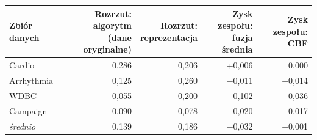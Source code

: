 \begin{tabular}{lrrrr}
\toprule
Zbiór danych & \makecell[r]{Rozrzut: algorytm\\(dane oryginalne)} & \makecell[r]{Rozrzut:\\reprezentacja} & \makecell[r]{Zysk zespołu:\\fuzja średnia} & \makecell[r]{Zysk zespołu:\\CBF} \\
\midrule
Cardio & 0,286 & 0,206 & +0,006 & 0,000 \\
Arrhythmia & 0,125 & 0,260 & $-$0,011 & +0,014 \\
WDBC & 0,055 & 0,200 & $-$0,102 & $-$0,036 \\
Campaign & 0,090 & 0,078 & $-$0,020 & +0,017 \\
\textit{średnio} & 0,139 & 0,186 & $-$0,032 & $-$0,001 \\
\bottomrule
\end{tabular}
